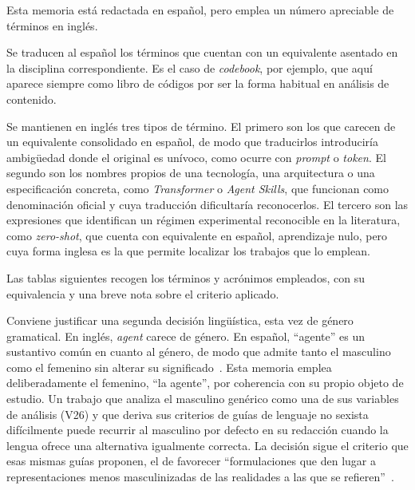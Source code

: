 
Esta memoria está redactada en español, pero emplea un número apreciable de
términos en inglés.

Se traducen al español los términos que cuentan con un equivalente asentado en la
disciplina correspondiente. Es el caso de \textit{codebook}, por ejemplo, que aquí aparece
siempre como libro de códigos por ser la forma habitual en análisis de contenido.

Se mantienen en inglés tres tipos de término. El primero son los que carecen de un
equivalente consolidado en español, de modo que traducirlos introduciría ambigüedad
donde el original es unívoco, como ocurre con \textit{prompt} o \textit{token}. El
segundo son los nombres propios de una tecnología, una arquitectura o una
especificación concreta, como \textit{Transformer} o \textit{Agent Skills}, que
funcionan como denominación oficial y cuya traducción dificultaría reconocerlos. El
tercero son las expresiones que identifican un régimen experimental reconocible en
la literatura, como \textit{zero-shot}, que cuenta con equivalente en español,
aprendizaje nulo, pero cuya forma inglesa es la que permite localizar los trabajos
que lo emplean.

Las tablas siguientes recogen los términos y acrónimos empleados, con su equivalencia
y una breve nota sobre el criterio aplicado.

Conviene justificar una segunda decisión lingüística, esta vez de género
gramatical. En inglés, \textit{agent} carece de género. En español, ``agente'' es un
sustantivo común en cuanto al género, de modo que admite tanto el masculino como el
femenino sin alterar su significado~\cite{rae_nueva_gramatica}. Esta memoria emplea
deliberadamente el femenino, ``la agente'', por coherencia con su propio objeto de
estudio. Un trabajo que analiza el masculino genérico como una de sus variables de
análisis (V26) y que deriva sus criterios de guías de lenguaje no sexista
difícilmente puede recurrir al masculino por defecto en su redacción cuando la lengua
ofrece una alternativa igualmente correcta. La decisión sigue el criterio que esas
mismas guías proponen, el de favorecer ``formulaciones que den lugar a
representaciones menos masculinizadas de las realidades a las que se
refieren''~\cite{yufera2023}.

